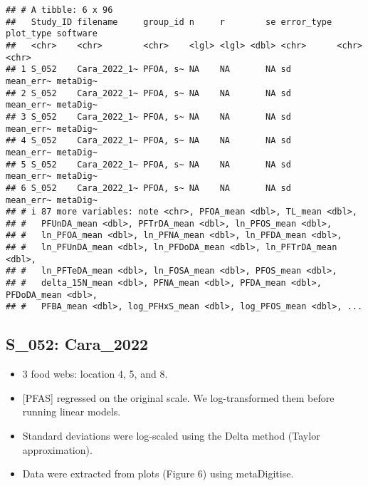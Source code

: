 \documentclass[
]{article}
\providecommand{\tightlist}{%
  \setlength{\itemsep}{0pt}\setlength{\parskip}{0pt}}
\begin{document}
\begin{verbatim}
## # A tibble: 6 x 96
##   Study_ID filename     group_id n     r        se error_type plot_type software
##   <chr>    <chr>        <chr>    <lgl> <lgl> <dbl> <chr>      <chr>     <chr>   
## 1 S_052    Cara_2022_1~ PFOA, s~ NA    NA       NA sd         mean_err~ metaDig~
## 2 S_052    Cara_2022_1~ PFOA, s~ NA    NA       NA sd         mean_err~ metaDig~
## 3 S_052    Cara_2022_1~ PFOA, s~ NA    NA       NA sd         mean_err~ metaDig~
## 4 S_052    Cara_2022_1~ PFOA, s~ NA    NA       NA sd         mean_err~ metaDig~
## 5 S_052    Cara_2022_1~ PFOA, s~ NA    NA       NA sd         mean_err~ metaDig~
## 6 S_052    Cara_2022_1~ PFOA, s~ NA    NA       NA sd         mean_err~ metaDig~
## # i 87 more variables: note <chr>, PFOA_mean <dbl>, TL_mean <dbl>,
## #   PFUnDA_mean <dbl>, PFTrDA_mean <dbl>, ln_PFOS_mean <dbl>,
## #   ln_PFOA_mean <dbl>, ln_PFNA_mean <dbl>, ln_PFDA_mean <dbl>,
## #   ln_PFUnDA_mean <dbl>, ln_PFDoDA_mean <dbl>, ln_PFTrDA_mean <dbl>,
## #   ln_PFTeDA_mean <dbl>, ln_FOSA_mean <dbl>, PFOS_mean <dbl>,
## #   delta_15N_mean <dbl>, PFNA_mean <dbl>, PFDA_mean <dbl>, PFDoDA_mean <dbl>,
## #   PFBA_mean <dbl>, log_PFHxS_mean <dbl>, log_PFOS_mean <dbl>, ...
\end{verbatim}

\subsection{S\_052: Cara\_2022}\label{s_052-cara_2022}

\begin{itemize}
\tightlist
\item
  3 food webs: location 4, 5, and 8.
\item
  {[}PFAS{]} regressed on the original scale. We log-transformed them
  before running linear models.
\item
  Standard deviations were log-scaled using the Delta method (Taylor
  approximation).
\item
  Data were extracted from plots (Figure 6) using metaDigitise.
\end{itemize}
\end{document}
